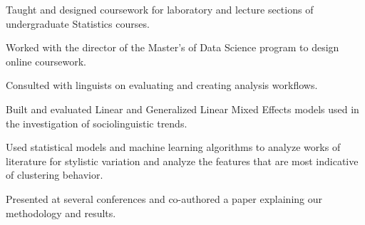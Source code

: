\documentclass[letterpaper]{deedy-resume} %
\begin{document}
\begin{minipage}[t]{0.63\textwidth}


\begin{tightitemize}
\item Taught and designed coursework for laboratory and
  lecture sections of undergraduate Statistics courses.
\item Worked with the director of the Master's of Data Science program
  to design online coursework.
\end{tightitemize}

\sectionspace %


\begin{tightitemize}
\item Consulted with linguists on evaluating and creating analysis workflows.
\item Built and evaluated Linear and Generalized Linear Mixed Effects
  models used in the investigation of sociolinguistic trends.
\end{tightitemize}

\sectionspace %


\begin{tightitemize}
\item Used statistical models and machine learning algorithms to analyze
  works of literature for stylistic variation and analyze the features
  that are most indicative of clustering behavior.
\item Presented at several conferences and co-authored a paper
  explaining our methodology and results.
\end{tightitemize}

\sectionspace %
\vspace{-6pt}

\end{minipage}
\end{document}

